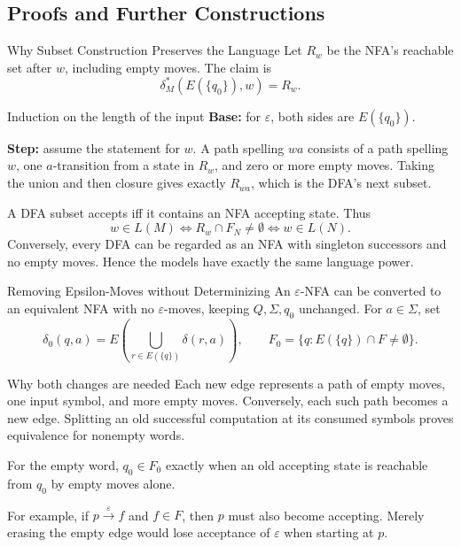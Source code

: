 \documentclass[10pt]{beamer}
\begin{document}
\subsection{Proofs and Further Constructions}

\begin{frame}{Why Subset Construction Preserves the Language}
  \small
  Let $R_w$ be the NFA's reachable set after $w$, including empty moves.
  The claim is
  \[
    \delta_M^*(E(\{q_0\}),w)=R_w.
  \]
  \begin{block}{Induction on the length of the input}
    \textbf{Base:} for $\varepsilon$, both sides are $E(\{q_0\})$.
    \par\smallskip
    \textbf{Step:} assume the statement for $w$. A path spelling $wa$
    consists of a path spelling $w$, one $a$-transition from a state in $R_w$,
    and zero or more empty moves. Taking the union and then closure gives
    exactly $R_{wa}$, which is the DFA's next subset.
  \end{block}
  \pause
  A DFA subset accepts iff it contains an NFA accepting state. Thus
  \[
    w\in L(M)\iff R_w\cap F_N\ne\emptyset\iff w\in L(N).
  \]
  Conversely, every DFA can be regarded as an NFA with singleton successors
  and no empty moves. Hence the models have exactly the same language power.
\end{frame}

\begin{frame}{Removing Epsilon-Moves without Determinizing}
  \small
  An $\varepsilon$-NFA can be converted to an equivalent NFA with no
  $\varepsilon$-moves, keeping $Q,\Sigma,q_0$ unchanged. For $a\in\Sigma$, set
  \[
    \delta_0(q,a)=E\!\left(\bigcup_{r\in E(\{q\})}\delta(r,a)\right),
    \qquad
    F_0=\{q:E(\{q\})\cap F\ne\emptyset\}.
  \]
  \pause
  \begin{block}{Why both changes are needed}
    Each new edge represents a path of empty moves, one input symbol,
    and more empty moves. Conversely, each such path becomes a new edge.
    Splitting an old successful computation at its consumed symbols proves
    equivalence for nonempty words.
    \par\smallskip
    For the empty word, $q_0\in F_0$ exactly when an old accepting state
    is reachable from $q_0$ by empty moves alone.
  \end{block}
  For example, if $p\xrightarrow{\varepsilon}f$ and $f\in F$, then $p$
  must also become accepting. Merely erasing the empty edge would lose
  acceptance of $\varepsilon$ when starting at $p$.
\end{frame}
\end{document}
